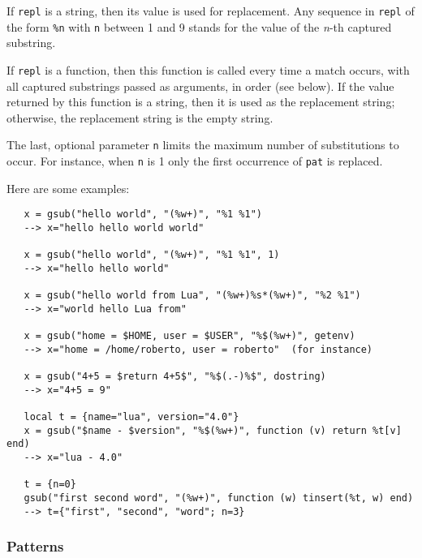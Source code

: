 \documentclass[11pt]{article}
\newcommand{\M}[1]{{\rm\emph{#1}}}
\begin{document}
If \verb|repl| is a string, then its value is used for replacement.
Any sequence in \verb|repl| of the form \verb|%n|
with \verb|n| between 1 and 9
stands for the value of the \M{n}-th captured substring.

If \verb|repl| is a function, then this function is called every time a
match occurs, with all captured substrings passed as arguments,
in order (see below).
If the value returned by this function is a string,
then it is used as the replacement string;
otherwise, the replacement string is the empty string.

The last, optional parameter \verb|n| limits
the maximum number of substitutions to occur.
For instance, when \verb|n| is 1 only the first occurrence of
\verb|pat| is replaced.

Here are some examples:
\begin{verbatim}
   x = gsub("hello world", "(%w+)", "%1 %1")
   --> x="hello hello world world"

   x = gsub("hello world", "(%w+)", "%1 %1", 1)
   --> x="hello hello world"

   x = gsub("hello world from Lua", "(%w+)%s*(%w+)", "%2 %1")
   --> x="world hello Lua from"

   x = gsub("home = $HOME, user = $USER", "%$(%w+)", getenv)
   --> x="home = /home/roberto, user = roberto"  (for instance)

   x = gsub("4+5 = $return 4+5$", "%$(.-)%$", dostring)
   --> x="4+5 = 9"

   local t = {name="lua", version="4.0"}
   x = gsub("$name - $version", "%$(%w+)", function (v) return %t[v] end)
   --> x="lua - 4.0"

   t = {n=0}
   gsub("first second word", "(%w+)", function (w) tinsert(%t, w) end)
   --> t={"first", "second", "word"; n=3}
\end{verbatim}


\subsubsection*{Patterns} \label{pm}
\end{document}
